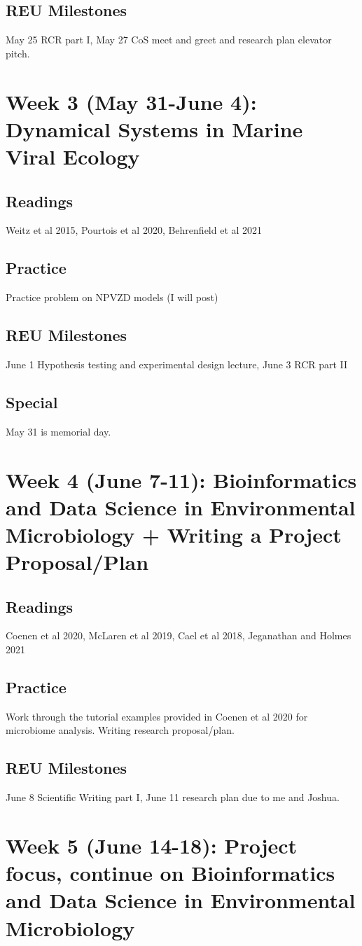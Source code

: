\documentclass[11pt]{amsart}
\begin{document}
\subsection{REU Milestones} May 25 RCR part I, May 27 CoS meet and greet and research plan elevator pitch.
\section{Week 3 (May 31-June 4): Dynamical Systems in Marine Viral Ecology}
\subsection{Readings} Weitz et al 2015, Pourtois et al 2020, Behrenfield et al 2021
\subsection{Practice} Practice problem on NPVZD models (I will post)
\subsection{REU Milestones} June 1 Hypothesis testing and experimental design lecture, June 3 RCR part II
\subsection{Special} May 31 is memorial day. 
\section{Week 4 (June 7-11): Bioinformatics and Data Science in Environmental Microbiology + Writing a Project Proposal/Plan}
\subsection{Readings} Coenen et al 2020, McLaren et al 2019, Cael et al 2018, Jeganathan and Holmes 2021
\subsection{Practice} Work through the tutorial examples provided in Coenen et al 2020 for microbiome analysis. Writing research proposal/plan.
\subsection{REU Milestones} June 8 Scientific Writing part I, June 11 research plan due to me and Joshua. 
\section{Week 5 (June 14-18): Project focus, continue on Bioinformatics and Data Science in Environmental Microbiology}
\end{document}
